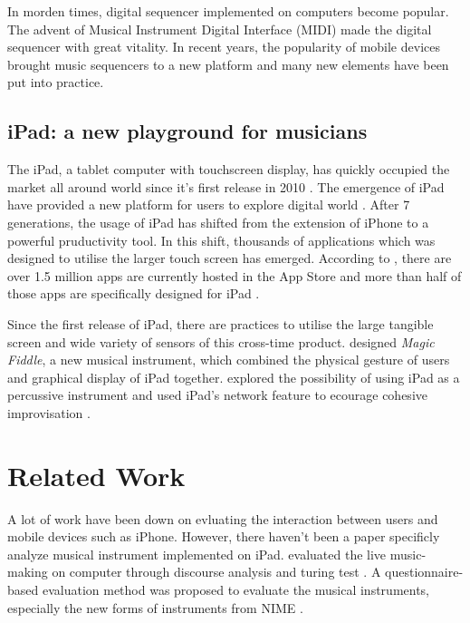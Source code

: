In morden times, digital sequencer implemented on computers become popular. The advent of Musical Instrument Digital Interface (MIDI) made the digital sequencer with great vitality. In recent years, the popularity of mobile devices brought music sequencers to a new platform and many new elements have been put into practice.

\subsection{iPad: a new playground for musicians}
\label{subsec: iPad}

The iPad, a tablet computer with touchscreen display, has quickly occupied the market all around world since it's first release in 2010 \citep{Reference2}. The emergence of iPad have provided a new platform for users to explore digital world \citep{Reference1}. After 7 generations, the usage of iPad has shifted from the extension of iPhone to a powerful pruductivity tool. In this shift, thousands of applications which was designed to utilise the larger touch screen has emerged. According to \citeauthor{lifewire}, there are over 1.5 million apps are currently hosted in the App Store and more than half of those apps are specifically designed for iPad \citep{lifewire}.

Since the first release of iPad, there are practices to utilise the large tangible screen and wide variety of sensors of this cross-time product. \citeauthor{Reference8.4} designed \textit{Magic Fiddle}, a new musical instrument, which combined the physical gesture of users and graphical display of iPad together. \citeauthor{Reference19} explored the possibility of using iPad as a percussive instrument and used iPad's network feature to ecourage cohesive improvisation \citep{Reference19}.

\section{Related Work}

A lot of work have been down on evluating the interaction between users and mobile devices such as iPhone. However, there haven't been a paper specificly analyze musical instrument implemented on iPad. \citeauthor{Reference21} evaluated the live music-making on computer through discourse analysis and turing test \citep{Reference21}. A questionnaire-based evaluation method was proposed to evaluate the musical instruments, especially the new forms of instruments from NIME \citep{Reference0}.

